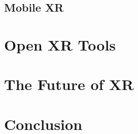 

\subsection{Mobile XR}
\section{Open XR Tools }
\section{The Future of XR}
\section{Conclusion}



